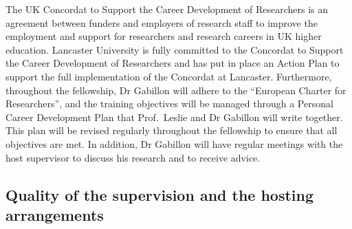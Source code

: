 \documentclass[a4paper,11pt]{article}
\begin{document}
The UK Concordat to Support the Career Development of Researchers is an agreement between funders and employers of research staff to improve the employment and support for researchers and research careers in UK higher education.  Lancaster University is fully committed to the Concordat to Support the Career Development of Researchers and has put in place an Action Plan to support the full implementation of the Concordat at Lancaster.  Furthermore, throughout the fellowship, Dr Gabillon will adhere to the ``European Charter for Researchers'', and the training objectives will be managed through a Personal Career Development Plan that Prof.\ Leslie and Dr Gabillon will write together.  This plan will be revised regularly throughout the fellowship to ensure that all objectives are met.  In addition, Dr Gabillon will have regular meetings with the host supervisor to discuss his research and to receive advice.


\subsection{Quality of the supervision and the hosting arrangements}
\label{sec:supervision}
\end{document}
